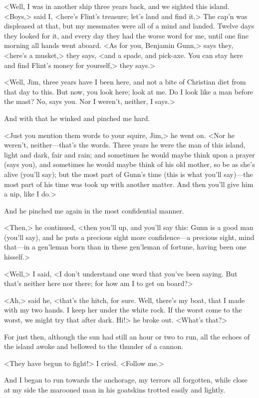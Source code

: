 <Well, I was in another ship three years back, and we sighted this island. <Boys,> said I, <here's Flint's treasure; let's land and find it.> The cap'n was displeased at that, but my messmates were all of a mind and landed. Twelve days they looked for it, and every day they had the worse word for me, until one fine morning all hands went aboard. <As for you, Benjamin Gunn,> says they, <here's a musket,> they says, <and a spade, and pick-axe. You can stay here and find Flint's money for yourself,> they says.>

<Well, Jim, three years have I been here, and not a bite of Christian diet from that day to this. But now, you look here; look at me. Do I look like a man before the mast? No, says you. Nor I weren't, neither, I says.>

And with that he winked and pinched me hard.

<Just you mention them words to your squire, Jim,> he went on. <Nor he weren't, neither—that's the words. Three years he were the man of this island, light and dark, fair and rain; and sometimes he would maybe think upon a prayer (says you), and sometimes he would maybe think of his old mother, so be as she's alive (you'll say); but the most part of Gunn's time (this is what you'll say)—the most part of his time was took up with another matter. And then you'll give him a nip, like I do.>

And he pinched me again in the most confidential manner.

<Then,> he continued, <then you'll up, and you'll say this: Gunn is a good man (you'll say), and he puts a precious sight more confidence—a precious sight, mind that—in a gen'leman born than in these gen'leman of fortune, having been one hisself.>

<Well,> I said, <I don't understand one word that you've been saying. But that's neither here nor there; for how am I to get on board?>

<Ah,> said he, <that's the hitch, for sure. Well, there's my boat, that I made with my two hands. I keep her under the white rock. If the worst come to the worst, we might try that after dark. Hi!> he broke out. <What's that?>

For just then, although the sun had still an hour or two to run, all the echoes of the island awoke and bellowed to the thunder of a cannon.

<They have begun to fight!> I cried. <Follow me.>

And I began to run towards the anchorage, my terrors all forgotten, while close at my side the marooned man in his goatskins trotted easily and lightly.


